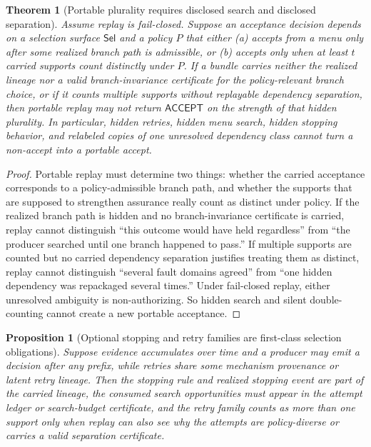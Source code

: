 \documentclass[11pt]{article}
\newtheorem{theorem}{Theorem}
\newtheorem{proposition}{Proposition}
\theoremstyle{remark}
\newcommand{\Acc}{\mathsf{ACCEPT}}
\newcommand{\Sel}{\mathsf{Sel}}
\begin{document}
\begin{theorem}[Portable plurality requires disclosed search and disclosed separation]
Assume replay is fail-closed.
Suppose an acceptance decision depends on a selection surface $\Sel$ and a policy $P$ that either
(a) accepts from a menu only after some realized branch path is admissible, or
(b) accepts only when at least $t$ carried supports count distinctly under $P$.
If a bundle carries neither the realized lineage nor a valid branch-invariance certificate for the policy-relevant branch choice,
or if it counts multiple supports without replayable dependency separation, then portable replay may not return $\Acc$ on the strength of that hidden plurality.
In particular, hidden retries, hidden menu search, hidden stopping behavior, and relabeled copies of one unresolved dependency class cannot turn a non-accept into a portable accept.
\end{theorem}

\begin{proof}
Portable replay must determine two things: whether the carried acceptance corresponds to a policy-admissible branch path,
and whether the supports that are supposed to strengthen assurance really count as distinct under policy.
If the realized branch path is hidden and no branch-invariance certificate is carried, replay cannot distinguish
``this outcome would have held regardless'' from ``the producer searched until one branch happened to pass.''
If multiple supports are counted but no carried dependency separation justifies treating them as distinct,
replay cannot distinguish ``several fault domains agreed'' from ``one hidden dependency was repackaged several times.''
Under fail-closed replay, either unresolved ambiguity is non-authorizing.
So hidden search and silent double-counting cannot create a new portable acceptance.
\end{proof}

\begin{proposition}[Optional stopping and retry families are first-class selection obligations]
Suppose evidence accumulates over time and a producer may emit a decision after any prefix, while retries share some mechanism provenance or latent retry lineage.
Then the stopping rule and realized stopping event are part of the carried lineage, the consumed search opportunities must appear in the attempt ledger or search-budget certificate,
and the retry family counts as more than one support only when replay can also see why the attempts are policy-diverse or carries a valid separation certificate.
\end{proposition}
\end{document}
